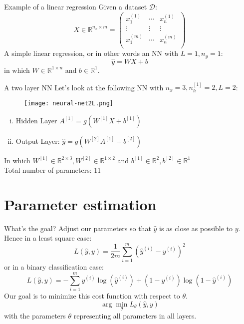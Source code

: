 \documentclass{beamer}
\begin{document}
\begin{frame}[t]{Example of a linear regression}
  Given a dataset $\mathcal{D}$:
  \begin{equation}
    X \in \mathbb{R}^{n_x \times m}  = 
    \begin{pmatrix}
      x^{(1)}_1 & \cdots & x^{(1)}_n \\
      \vdots & \vdots & \vdots \\
      x^{(m)}_1 & \cdots & x^{(m)}_n \\
    \end{pmatrix}
  \end{equation}
  A simple linear regression, or in other words an NN with $L=1, n_y=1$:
  \begin{equation}
    \hat{y} = WX+b
  \end{equation}
  in which $W \in \mathbb{R}^{1 \times n}$ and $b \in \mathbb{R}^{1}$.
\end{frame}

\begin{frame}[t]{A two layer NN}
  \small
  Let's look at the following NN with $n_x=3, n_h^{[1]} = 2, L=2$:
  \begin{figure}[htpb]
    \centering
    \texttt{[image: neural-net2L.png]}
  \end{figure}
  \begin{enumerate}[(i)]
    \item Hidden Layer $A^{[1]} = g(W^{[1]}X + b^{[1]})$
    \item Output Layer: $\hat{y} = g(W^{[2]}A^{[1]} + b^{[2]})$
  \end{enumerate}
  In which $W^{[1]} \in \mathbb{R}^{2\times 3}, W^{[2]} \in \mathbb{R}^{1 \times 2}$ and
  $b^{[1]} \in \mathbb{R}^{2}, b^{[2]} \in \mathbb{R}^{1}$ \\
  Total number of parameters: 11
\end{frame}

\section{Parameter estimation}
\label{sec:the_basics}

\begin{frame}[t]{What's the goal?}
  Adjust our parameters so that $\hat{y}$ is as close as possible to $y$. Hence in a least square case:
  \begin{equation}
    L(\hat{y}, y) = \frac{1}{2m} \sum^m_{i=1} {(\hat{y}^{(i)} - y^{(i)})}^2
  \end{equation}
  or in a binary classification case:
  \begin{equation}
    L(\hat{y}, y) = - \sum^m_{i=1} y^{(i)}\log(\hat{y}^{(i)}) + (1- y^{(i)})\log(1-\hat{y}^{(i)})
  \end{equation}
  Our goal is to minimize this cost function with respect to $\theta$.
  \begin{equation}
    \arg\min_\theta{L_\theta(\hat{y}, y)}
  \end{equation}
  with the parameters $\theta$ representing all parameters in all layers. 
\end{frame}
\end{document}
